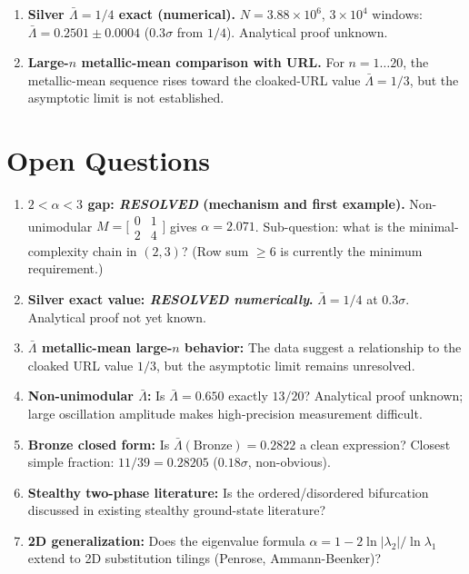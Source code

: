\documentclass[11pt,letterpaper]{article}
\begin{document}
\begin{enumerate}
  \item \textbf{Silver $\bar\Lambda = 1/4$ exact (numerical).}
        $N = 3.88\times10^6$, $3\times10^4$ windows: $\bar\Lambda = 0.2501 \pm 0.0004$
        ($0.3\sigma$ from $1/4$). Analytical proof unknown.

  \item \textbf{Large-$n$ metallic-mean comparison with URL.} For $n=1\ldots20$,
        the metallic-mean sequence rises toward the cloaked-URL value
        $\bar\Lambda=1/3$, but the asymptotic limit is not established.
\end{enumerate}

\section{Open Questions}

\begin{enumerate}
  \item \textbf{$2 < \alpha < 3$ gap: \emph{RESOLVED} (mechanism and first example).}
        Non-unimodular $M=\bigl[\begin{smallmatrix}0&1\\2&4\end{smallmatrix}\bigr]$
        gives $\alpha=2.071$.
        Sub-question: what is the minimal-complexity chain in $(2,3)$?
        (Row sum $\geq 6$ is currently the minimum requirement.)

  \item \textbf{Silver exact value: \emph{RESOLVED numerically}.}
        $\bar\Lambda = 1/4$ at $0.3\sigma$. Analytical proof not yet known.

  \item \textbf{$\bar\Lambda$ metallic-mean large-$n$ behavior:}
        The data suggest a relationship to the cloaked URL value $1/3$, but the
        asymptotic limit remains unresolved.

  \item \textbf{Non-unimodular $\bar\Lambda$:} Is $\bar\Lambda = 0.650$ exactly $13/20$?
        Analytical proof unknown; large oscillation amplitude makes high-precision
        measurement difficult.

  \item \textbf{Bronze closed form:} Is $\bar\Lambda(\text{Bronze}) = 0.2822$ a clean
        expression? Closest simple fraction: $11/39 = 0.28205$ ($0.18\sigma$, non-obvious).

  \item \textbf{Stealthy two-phase literature:} Is the ordered/disordered bifurcation
        discussed in existing stealthy ground-state literature?

  \item \textbf{2D generalization:} Does the eigenvalue formula
        $\alpha = 1 - 2\ln|\lambda_2|/\ln\lambda_1$ extend to 2D substitution
        tilings (Penrose, Ammann-Beenker)?
\end{enumerate}
\end{document}
